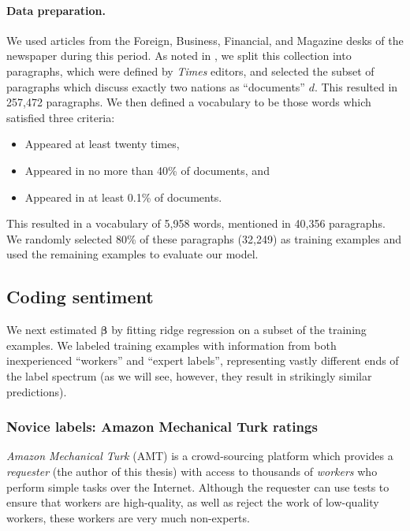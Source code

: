 \paragraph{Data preparation.}
We used articles from the Foreign, Business, Financial, and Magazine
desks of the newspaper during this period. As noted in
, we split this collection into paragraphs,
which were defined by \emph{Times} editors, and selected the subset of paragraphs
which discuss exactly two nations as ``documents'' $d$.  This resulted
in 257,472 paragraphs.  We then defined a vocabulary to be those words
which satisfied three criteria:
\begin{itemize}
  \item Appeared at least twenty times,
  \item Appeared in no more than 40\% of documents, and
  \item Appeared in at least 0.1\% of documents.
\end{itemize}
This resulted in a vocabulary of 5,958 words, mentioned in 40,356
paragraphs. We randomly selected 80\% of these paragraphs (32,249) as
training examples and used the remaining examples to evaluate our
model.

\subsection*{Coding sentiment}
\label{section:sentiment_models}

We next estimated $\bm \beta$ by fitting ridge regression on a subset
of the training examples.  We labeled training examples with
information from both inexperienced ``workers'' and ``expert labels'',
representing vastly different ends of the label spectrum (as we will
see, however, they result in strikingly similar predictions).

\subsubsection{Novice labels: Amazon Mechanical Turk ratings}
\label{section:mturk}

\emph{Amazon Mechanical Turk} (AMT) is a crowd-sourcing platform which
provides a \emph{requester} (the author of this thesis) with access to
thousands of \emph{workers} who perform simple tasks over the
Internet.  Although the requester can use tests to ensure that workers
are high-quality, as well as reject the work of low-quality workers,
these workers are very much non-experts.

